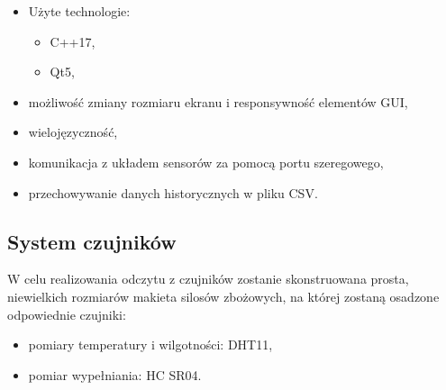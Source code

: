         \begin{itemize}
            \item Użyte technologie: 
            \begin{itemize}
                \item C++17,
                \item Qt5,
            \end{itemize}
            \item możliwość zmiany rozmiaru ekranu i responsywność elementów GUI,
            \item wielojęzyczność,
            \item komunikacja z układem sensorów za pomocą portu szeregowego,
            \item przechowywanie danych historycznych w pliku CSV.
        \end{itemize}

    \subsection{System czujników}
        W celu realizowania odczytu z czujników zostanie skonstruowana prosta, niewielkich rozmiarów makieta silosów zbożowych, na której 
        zostaną osadzone odpowiednie czujniki:
        \begin{itemize}
            \item pomiary temperatury i wilgotności: DHT11,
            \item pomiar wypełniania: HC SR04.
        \end{itemize}
    
    